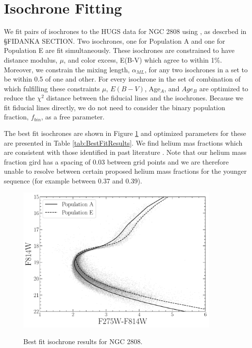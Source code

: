 \section{Isochrone Fitting}\label{sec:isoFit}
We fit pairs of isochrones to the HUGS data for NGC 2808 using \fidanka, as
descrbed in \S {\color{red}FIDANKA SECTION}. Two isochrones, one for Population
A and one for Population E are fit simultaneously. These isochrones are
constrained to have distance modulus, $\mu$, and color excess, E(B-V) which
agree to within 1\%. Moreover, we constrain the mixing length, $\alpha_{ML}$, for any two isochrones in a set to be within 0.5 of one and other. For every isochrone in the
set of combination of which fulfilling these constraints $\mu$, $E(B-V)$,
Age$_{A}$, and $Age_{B}$ are optimized to reduce the $\chi^{2}$ distance
between the fiducial lines and the isochrones. Because we fit fiducial lines
directly, we do not need to consider the binary population fraction, $f_{bin}$,
as a free parameter.

The best fit isochrones are shown in Figure \ref{fig:BestFitResults} and optimized
parameters for these are presented in Table \ref{tab:BestFitResults}. We find helium mas fractions which are consistent with those identified in past literature \citep[e.g.][]{Milone2015}. Note that our helium mass fraction gird has a spacing of 0.03 between grid points and we are therefore unable to resolve between certain proposed helium mass fractions for the younger sequence (for example between 0.37 and 0.39).

\begin{figure}
  \centering
  \includegraphics[width=0.9\textwidth]{src/figures/BestFitResults.pdf}
  \label{fig:BestFitResults}
  \caption{Best fit isochrone results for NGC 2808.}
\end{figure}

